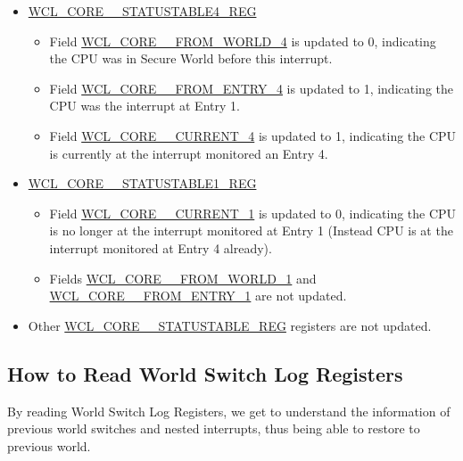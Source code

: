\documentclass[main\_\_EN.tex]{subfiles}
\begin{document}
\begin{enumerate}
        \begin{itemize}
        \item \hyperref[regdesc:WCLCORE0STATUSTABLEnREG]{WCL\_CORE\_\_STATUSTABLE4\_REG}
        \begin{itemize}
            \item Field \hyperref[fielddesc:WCLCORE0FROMWORLDn]{WCL\_CORE\_\_FROM\_WORLD\_4} is updated to 0, indicating the CPU was in Secure World before this interrupt.
            \item Field \hyperref[fielddesc:WCLCORE0FROMENTRYn]{WCL\_CORE\_\_FROM\_ENTRY\_4} is updated to 1, indicating the CPU was the interrupt at Entry 1.
            \item Field \hyperref[fielddesc:WCLCORE0CURRENTn]{WCL\_CORE\_\_CURRENT\_4} is updated to 1, indicating the CPU is currently at the interrupt monitored an Entry 4.
        \end{itemize}
        \item \hyperref[regdesc:WCLCORE0STATUSTABLEnREG]{WCL\_CORE\_\_STATUSTABLE1\_REG}
        \begin{itemize}
            \item Field \hyperref[fielddesc:WCLCORE0CURRENTn]{WCL\_CORE\_\_CURRENT\_1} is updated to 0, indicating the CPU is no longer at the interrupt monitored at Entry 1 (Instead CPU is at the interrupt monitored at Entry 4 already).
            \item Fields \hyperref[fielddesc:WCLCORE0FROMWORLDn]{WCL\_CORE\_\_FROM\_WORLD\_1} and \hyperref[fielddesc:WCLCORE0FROMENTRYn]{WCL\_CORE\_\_FROM\_ENTRY\_1} are not updated.
        \end{itemize}
        \item Other \hyperref[regdesc:WCLCORE0STATUSTABLEnREG]{WCL\_CORE\_\_STATUSTABLE\_REG} registers are not updated.
\end{itemize}
\end{enumerate}

\subsection{How to Read World Switch Log Registers} \label{sec:wctrl-read-table}

By reading World Switch Log Registers, we get to understand the information of previous world switches and nested interrupts, thus being able to restore to previous world.
\end{document}
